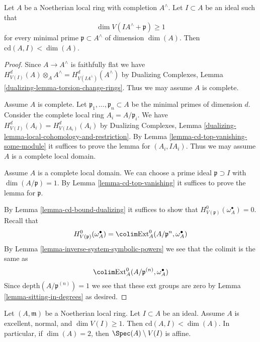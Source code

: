 \begin{proposition}
\label{proposition-Hartshorne-Lichtenbaum-vanishing}
\begin{reference}
\cite[Theorem 3.1]{CD}
\end{reference}
Let $A$ be a Noetherian local ring with completion $A^\wedge$.
Let $I \subset A$ be an ideal such that
$$
\dim V(IA^\wedge + \mathfrak p) \geq 1
$$
for every minimal prime $\mathfrak p \subset A^\wedge$ of dimension $\dim(A)$.
Then $\text{cd}(A, I) < \dim(A)$.
\end{proposition}

\begin{proof}
Since $A \to A^\wedge$ is faithfully flat we have
$H^d_{V(I)}(A) \otimes_A A^\wedge = H^d_{V(IA^\wedge)}(A^\wedge)$
by Dualizing Complexes, Lemma \ref{dualizing-lemma-torsion-change-rings}.
Thus we may assume $A$ is complete.

\medskip\noindent
Assume $A$ is complete. Let $\mathfrak p_1, \ldots, \mathfrak p_n \subset A$
be the minimal primes of dimension $d$. Consider the complete local ring
$A_i = A/\mathfrak p_i$. We have $H^d_{V(I)}(A_i) = H^d_{V(IA_i)}(A_i)$
by Dualizing Complexes, Lemma
\ref{dualizing-lemma-local-cohomology-and-restriction}.
By Lemma \ref{lemma-cd-top-vanishing-some-module}
it suffices to prove the lemma for $(A_i, IA_i)$.
Thus we may assume $A$ is a complete local domain.

\medskip\noindent
Assume $A$ is a complete local domain. We can choose a prime ideal
$\mathfrak p \supset I$ with $\dim(A/\mathfrak p) = 1$.
By Lemma \ref{lemma-cd-top-vanishing}
it suffices to prove the lemma for $\mathfrak p$.

\medskip\noindent
By Lemma \ref{lemma-cd-bound-dualizing} it suffices to show that
$H^0_{V(\mathfrak p)}(\omega_A^\bullet) = 0$.
Recall that
$$
H^0_{V(\mathfrak p)}(\omega_A^\bullet) =
\colim \text{Ext}^0_A(A/\mathfrak p^n, \omega_A^\bullet)
$$
By Lemma \ref{lemma-inverse-system-symbolic-powers}
we see that the colimit is the same as
$$
\colim \text{Ext}^0_A(A/\mathfrak p^{(n)}, \omega_A^\bullet)
$$
Since $\text{depth}(A/\mathfrak p^{(n)}) = 1$ we see that
these ext groups are zero by Lemma \ref{lemma-sitting-in-degrees}
as desired.
\end{proof}

\begin{lemma}
\label{lemma-affine-complement}
Let $(A, \mathfrak m)$ be a Noetherian local ring.
Let $I \subset A$ be an ideal. Assume $A$ is excellent,
normal, and $\dim V(I) \geq 1$. Then $\text{cd}(A, I) < \dim(A)$.
In particular, if $\dim(A) = 2$, then $\Spec(A) \setminus V(I)$ is affine.
\end{lemma}

